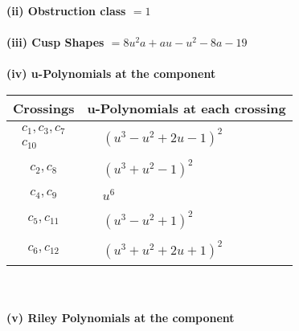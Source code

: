 \documentclass[1p]{elsarticle_modified}
\theoremstyle{definition}
\begin{document}
\flushleft \textbf{(ii) Obstruction class $= 1$}\\~\\
\flushleft \textbf{(iii) Cusp Shapes $= 8 u^2 a+a u- u^2-8 a-19$}\\~\\
\newpage\renewcommand{\arraystretch}{1}
\flushleft \textbf{(iv) u-Polynomials at the component}\newline \\
\begin{tabular}{m{50pt}|m{274pt}}
Crossings & \hspace{64pt}u-Polynomials at each crossing \\
\hline $$\begin{aligned}c_{1},c_{3},c_{7}\\c_{10}\end{aligned}$$&$\begin{aligned}
&(u^3- u^2+2 u-1)^2
\end{aligned}$\\
\hline $$\begin{aligned}c_{2},c_{8}\end{aligned}$$&$\begin{aligned}
&(u^3+u^2-1)^2
\end{aligned}$\\
\hline $$\begin{aligned}c_{4},c_{9}\end{aligned}$$&$\begin{aligned}
&u^6
\end{aligned}$\\
\hline $$\begin{aligned}c_{5},c_{11}\end{aligned}$$&$\begin{aligned}
&(u^3- u^2+1)^2
\end{aligned}$\\
\hline $$\begin{aligned}c_{6},c_{12}\end{aligned}$$&$\begin{aligned}
&(u^3+u^2+2 u+1)^2
\end{aligned}$\\
\hline
\end{tabular}\\~\\
\newpage\renewcommand{\arraystretch}{1}
\flushleft \textbf{(v) Riley Polynomials at the component}\newline \\
\end{document}
